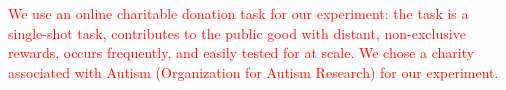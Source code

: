 

\textcolor{red}{We use an online charitable donation task for our experiment: the task is a  single-shot task, contributes to the public good with distant, non-exclusive rewards, occurs frequently, and easily tested for at scale. We chose a charity associated with Autism (Organization for Autism Research) for our experiment.}

